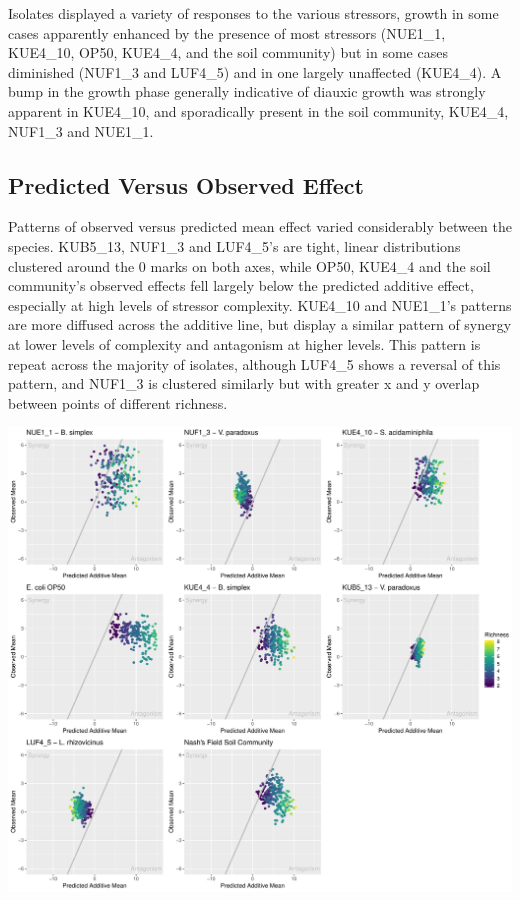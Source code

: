 \documentclass[final,1p,times]{elsarticle}
\begin{document}
Isolates displayed a variety of responses to the various stressors, growth in some cases apparently enhanced by the presence of most stressors (NUE1\_1, KUE4\_10, OP50, KUE4\_4, and the soil community) but in some cases diminished (NUF1\_3 and LUF4\_5) and in one largely unaffected (KUE4\_4). A bump in  the growth phase generally indicative of diauxic growth was strongly apparent in KUE4\_10, and sporadically present in the soil community, KUE4\_4, NUF1\_3 and NUE1\_1. 

\subsection{Predicted Versus Observed Effect}
\label{S:3:4}

Patterns of observed versus predicted mean effect varied considerably between the species. KUB5\_13, NUF1\_3 and LUF4\_5’s are tight, linear distributions clustered around the 0 marks on both axes, while OP50, KUE4\_4 and the soil community’s observed effects fell largely below the predicted additive effect, especially at high levels of stressor complexity. KUE4\_10 and NUE1\_1’s patterns are more diffused across the additive line, but display a similar pattern of synergy at lower levels of complexity and antagonism at higher levels. This pattern is repeat across the majority of isolates, although LUF4\_5 shows a reversal of this pattern, and NUF1\_3 is clustered similarly but with greater x and y overlap between points of different richness.

\includegraphics[scale = 0.25]{Scripts/Results/Final_Pipeline/ObservedXPredicted.pdf}
\end{document}
